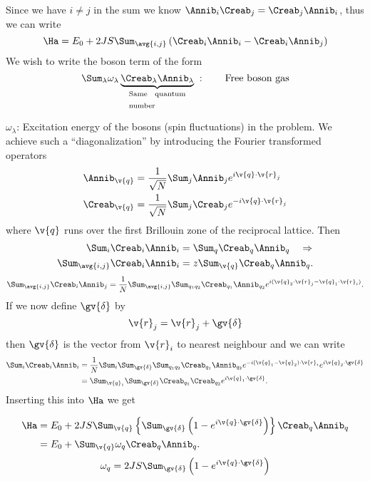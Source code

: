 Since we have $i\neq j$ in the sum we know $\Annib_i\Creab_j = \Creab_j\Annib_i$, thus we can write
\[\Ha = E_0 + 2JS\Sum_{\avg{i,j}}\left( \Creab_i\Annib_i - \Creab_i\Annib_j \right)\]
We wish to write the boson term of the form
\[\Sum_\lambda\omega_\lambda\underbrace{\Creab_\lambda\Annib_\lambda}_\text{\parbox{2cm}{Same quantum number}}\;: \quad\quad\text{Free boson gas}\]

$\omega_\lambda$: Excitation energy of the bosons (spin fluctuations) in the problem. We achieve such a ``diagonalization'' by introducing the Fourier transformed operators
\begin{align*}
  \Annib_\v{q}&=\frac{1}{\sqrt{N}}\Sum_j \Annib_je^{i\v{q}\cdot\v{r}_j}\\
  \Creab_\v{q}&=\frac{1}{\sqrt{N}} \Sum_j \Creab_je^{-i\v{q}\cdot\v{r}_j}
\end{align*}
where $\v{q}$ runs over the first Brillouin zone of the reciprocal lattice. Then
\begin{align*}
  \Sum_i\Creab_i\Annib_i &= \Sum_q\Creab_q\Annib_q\quad\Rightarrow\\
  \Sum_{\avg{i,j}}\Creab_i\Annib_i &= z\Sum_\v{q}\Creab_q\Annib_q.
\end{align*}
\[\Sum_{\avg{i,j}} \Creab_i\Annib_j = \frac{1}{N}\Sum_{\avg{i,j}}\Sum_{q_1q_2}\Creab_{q_1}\Annib_{q_2}e^{i(\v{q}_2\cdot\v{r}_j - \v{q}_1\cdot\v{r}_i)}.\]
If we now define $\gv{\delta}$ by
\[\v{r}_j = \v{r}_j + \gv{\delta}\]
then $\gv{\delta}$ is the vector from $\v{r}_i$ to nearest neighbour and we can write
\begin{align*}
  \Sum_i\Creab_i\Annib_i &= \frac{1}{N}\Sum_i\Sum_{\gv{\delta}}\Sum_{q_1q_2}\Creab_{q_1}\Annib_{q_2}e^{-i(\v{q}_1 - \v{q}_2)\cdot\v{r}_i}e^{i\v{q}_2\cdot\gv{\delta}}\\
  &= \Sum_{\v{q}_1}\Sum_{\gv{\delta}}\Creab_{q_1}\Creab_{q_2}e^{i\v{q}_1\cdot\gv{\delta}}.
\end{align*}
Inserting this into $\Ha$ we get
\begin{Indentskip}
\begin{align*}
  \Ha &= E_0 + 2JS\Sum_{\v{q}}\left\{\Sum_{\gv{\delta}}\left( 1-e^{i\v{q}\cdot\gv{\delta}} \right)\right\}\Creab_q\Annib_q\\
  &= E_0 + \Sum_\v{q}\omega_q\Creab_q\Annib_q.
\end{align*}
\[\omega_q = 2JS\Sum_{\gv{\delta}}\left( 1-e^{i\v{q}\cdot\gv{\delta}} \right)\]
\end{Indentskip}